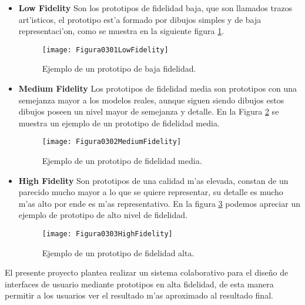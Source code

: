 \begin{itemize}
	\item \textbf{Low Fidelity}
	Son los prototipos de fidelidad baja, que son llamados trazos art'isticos, el prototipo est'a formado por dibujos simples y de baja representaci'on, como se muestra en la siguiente figura \ref{fig:LowFidelity}.

\begin{figure}[ht]
    \centering
    \texttt{[image: Figura0301LowFidelity]}
    \caption{Ejemplo de un prototipo de baja fidelidad.}
    \label{fig:LowFidelity}
\end{figure}
\medskip

	\item \textbf{Medium Fidelity}
	Los prototipos de fidelidad media son prototipos con una semejanza mayor a los modelos reales, aunque siguen siendo dibujos estos dibujos poseen un nivel mayor de semejanza y detalle. En la Figura \ref{fig:MediumFidelity} se muestra un ejemplo de un prototipo de fidelidad media.
	
\begin{figure}[ht]
    \centering
    \texttt{[image: Figura0302MediumFidelity]}
    \caption{Ejemplo de un prototipo de fidelidad media.}
    \label{fig:MediumFidelity}
\end{figure}

	\item \textbf{High Fidelity}
	Son prototipos de una calidad m'as elevada, constan de un parecido mucho mayor a lo que se quiere representar, su detalle es mucho m'as alto por ende es m'as representativo. En la figura \ref{fig:HighFidelity} podemos apreciar un ejemplo de prototipo de  alto nivel de fidelidad.

\begin{figure}[ht]
    \centering
    \texttt{[image: Figura0303HighFidelity]}
    \caption{Ejemplo de un prototipo de fidelidad alta.}
    \label{fig:HighFidelity}
\end{figure}	
\end{itemize}

El presente proyecto plantea realizar un sistema colaborativo para el dise\~no de interfaces de usuario mediante prototipos en alta fidelidad, de esta manera permitir a los usuarios ver el resultado m'as aproximado al resultado final.